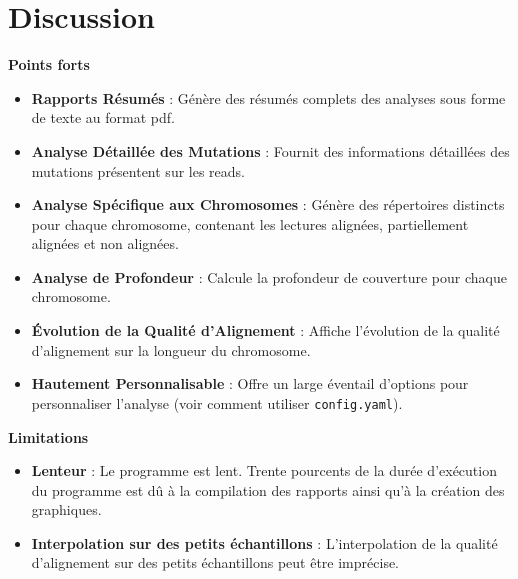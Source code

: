 \documentclass[11pt]{article}
\begin{document}
\section{Discussion}\label{sec:discussion}
\textbf{Points forts}\label{subsec:points-forts}
\begin{itemize}
    \item \textbf{Rapports Résumés} : Génère des résumés complets des analyses sous forme de texte au format pdf.
    \item \textbf{Analyse Détaillée des Mutations} : Fournit des informations détaillées des mutations présentent sur les reads.
    \item \textbf{Analyse Spécifique aux Chromosomes} : Génère des répertoires distincts pour chaque chromosome, contenant les lectures alignées, partiellement alignées et non alignées.
    \item \textbf{Analyse de Profondeur} : Calcule la profondeur de couverture pour chaque chromosome.
    \item \textbf{Évolution de la Qualité d'Alignement} : Affiche l'évolution de la qualité d'alignement sur la longueur du chromosome.
    \item \textbf{Hautement Personnalisable} : Offre un large éventail d'options pour personnaliser l'analyse (voir comment utiliser \texttt{config.yaml}).
\end{itemize}

\noindent \textbf{Limitations}\label{subsec:points-faibles}
\begin{itemize}
    \item \textbf{Lenteur} : Le programme est lent.
    Trente pourcents de la durée d'exécution du programme est dû à la compilation des rapports ainsi qu'à la création des graphiques.
    \item \textbf{Interpolation sur des petits échantillons} : L'interpolation de la qualité d'alignement sur des petits échantillons peut être imprécise.
\end{itemize}
\end{document}
